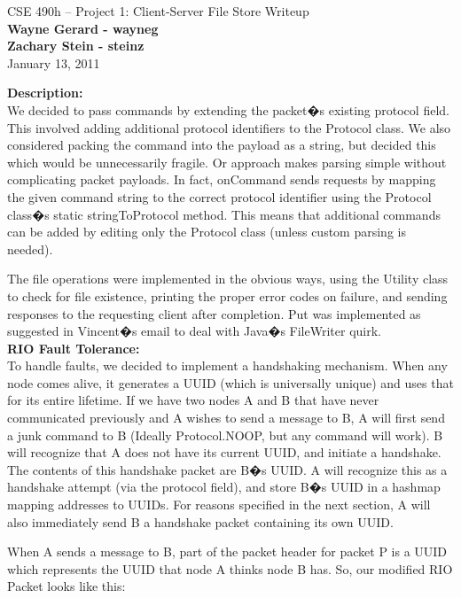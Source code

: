 \documentclass[11pt]{article}
\begin{document}
\begin{center}
{\large CSE 490h -- Project 1: Client-Server File Store Writeup} \\
\textbf{Wayne Gerard - wayneg} \\
\textbf{Zachary Stein - steinz} \\
January 13, 2011
\end{center}

\textbf{Description:} \\

We decided to pass commands by extending the packet�s existing protocol field. This involved adding additional protocol identifiers to the Protocol class. We also considered packing the command into the payload as a string, but decided this  which would be unnecessarily fragile. Or approach makes parsing simple without complicating packet payloads. In fact, onCommand sends requests by mapping the given command string to the correct protocol identifier using the Protocol class�s static stringToProtocol method. This means that additional commands can be added by editing only the Protocol class (unless custom parsing is needed).

The file operations were implemented in the obvious ways, using the Utility class to check for file existence, printing the proper error codes on failure, and sending responses to the requesting client after completion. Put was implemented as suggested in Vincent�s email to deal with Java�s FileWriter quirk. \\

\textbf{RIO Fault Tolerance:} \\

To handle faults, we decided to implement a handshaking mechanism. When any node comes alive, it generates a UUID (which is universally unique) and uses that for its entire lifetime. If we have two nodes A and B that have never communicated previously and A wishes to send a message to B, A will first send a junk command to B (Ideally Protocol.NOOP, but any command will work). B will recognize that A does not have its current UUID, and initiate a handshake. The contents of this handshake packet are B�s UUID. A will recognize this as a handshake attempt (via the protocol field), and store B�s UUID in a hashmap mapping addresses to UUIDs. For reasons specified in the next section, A will also immediately send B a handshake packet containing its own UUID.

When A sends a message to B, part of the packet header for packet P is a UUID which represents the UUID that node A thinks node B has. So, our modified RIO Packet looks like this:
\end{document}
